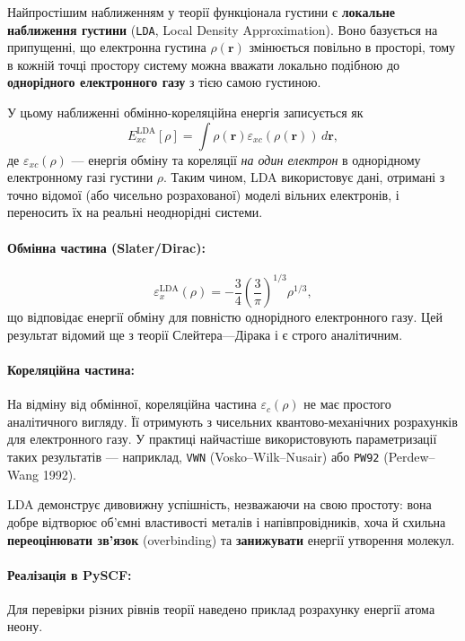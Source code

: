 Найпростішим наближенням у теорії функціонала густини є \textbf{локальне наближення густини} (\texttt{LDA}, Local Density Approximation).
Воно базується на припущенні, що електронна густина $\rho(\mathbf{r})$ змінюється повільно в просторі, тому в кожній точці простору систему можна вважати локально подібною до \textbf{однорідного електронного газу} з тією самою густиною.

У цьому наближенні обмінно-кореляційна енергія записується як
\begin{equation}
E_{xc}^{\text{LDA}}[\rho] = \int \rho(\mathbf{r}) \varepsilon_{xc}(\rho(\mathbf{r}))\, d\mathbf{r},
\end{equation}
де $\varepsilon_{xc}(\rho)$ --- енергія обміну та кореляції \emph{на один електрон} в однорідному електронному газі густини $\rho$.
Таким чином, LDA використовує дані, отримані з точно відомої (або чисельно розрахованої) моделі вільних електронів, і переносить їх на реальні неоднорідні системи.

\paragraph{Обмінна частина (Slater/Dirac):}
\begin{equation}
\varepsilon_x^{\text{LDA}}(\rho) = -\frac{3}{4}\left(\frac{3}{\pi}\right)^{1/3} \rho^{1/3},
\end{equation}
що відповідає енергії обміну для повністю однорідного електронного газу.
Цей результат відомий ще з теорії Слейтера—Дірака і є строго аналітичним.

\paragraph{Кореляційна частина:}
На відміну від обмінної, кореляційна частина $\varepsilon_c(\rho)$ не має простого аналітичного вигляду.
Її отримують з чисельних квантово-механічних розрахунків для електронного газу.
У практиці найчастіше використовують параметризації таких результатів — наприклад, \texttt{VWN} (Vosko–Wilk–Nusair) або \texttt{PW92} (Perdew–Wang 1992).

\medskip
LDA демонструє дивовижну успішність, незважаючи на свою простоту: вона добре відтворює об’ємні властивості металів і напівпровідників, хоча й схильна \textbf{переоцінювати зв’язок} (overbinding) та \textbf{занижувати} енергії утворення молекул.

\paragraph{Реалізація в PySCF:}
Для перевірки різних рівнів теорії наведено приклад розрахунку енергії атома неону.

